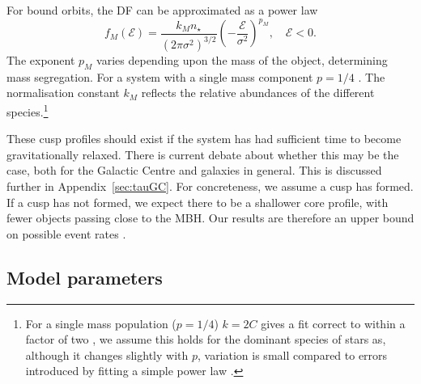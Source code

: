 \documentclass[useAMS,usedcolumn,usegraphicx,usenatbib]{mn2e}
\newcommand{\apref}[1]{Appendix~\ref{sec:#1}}
\begin{document}
For bound orbits, the DF can be approximated as a power law \citep{Peebles1972}
\begin{equation}
f_M(\mathcal{E}) = \frac{k_M n_\star}{(2\pi\sigma^2)^{3/2}}\left(-\frac{\mathcal{E}}{\sigma^2}\right)^{p_M},\quad\mathcal{E} < 0.
\label{eq:Bound_DF}
\end{equation}
The exponent $p_M$ varies depending upon the mass of the object, determining mass segregation. For a system with a single mass component $p = 1/4$ \citep{Bahcall1976, Young1977}. The normalisation constant $k_M$ reflects the relative abundances of the different species.\footnote{For a single mass population ($p = 1/4$) $k = 2 C$ gives a fit correct to within a factor of two \citep{Bahcall1976,Keshet2009}, we assume this holds for the dominant species of stars as, although it changes slightly with $p$, variation is small compared to errors introduced by fitting a simple power law \citep{Hopman2006, Alexander2009}.}

These cusp profiles should exist if the system has had sufficient time to become gravitationally relaxed. There is current debate about whether this may be the case, both for the Galactic Centre and galaxies in general. This is discussed further in \apref{tauGC}. For concreteness, we assume a cusp has formed. If a cusp has not formed, we expect there to be a shallower core profile, with fewer objects passing close to the MBH. Our results are therefore an upper bound on possible event rates \citep{Merritt2010a,Gualandris2012}. 

\subsection{Model parameters}\label{sec:GC-Param}
\end{document}
